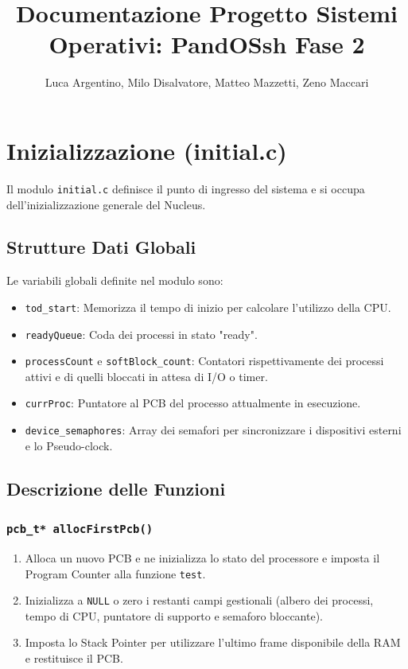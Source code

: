 \documentclass[a4paper,12pt]{article}
\title{Documentazione Progetto Sistemi Operativi: PandOSsh Fase 2}
\author{Luca Argentino, Milo Disalvatore, Matteo Mazzetti, Zeno Maccari}
\begin{document}
\maketitle

\section{Inizializzazione (initial.c)}
Il modulo \texttt{initial.c} definisce il punto di ingresso del sistema e si occupa dell'inizializzazione generale del Nucleus.

\vspace{0.5cm}
\subsection{Strutture Dati Globali}
Le variabili globali definite nel modulo sono:
\begin{itemize}
    \item \texttt{tod\_start}: Memorizza il tempo di inizio per calcolare l'utilizzo della CPU.
    \item \texttt{readyQueue}: Coda dei processi in stato "ready".
    \item \texttt{processCount} e \texttt{softBlock\_count}: Contatori rispettivamente dei processi attivi e di quelli bloccati in attesa di I/O o timer.
    \item \texttt{currProc}: Puntatore al PCB del processo attualmente in esecuzione.
    \item \texttt{device\_semaphores}: Array dei semafori per sincronizzare i dispositivi esterni e lo Pseudo-clock.
\end{itemize}

\vspace{0.5cm}
\subsection{Descrizione delle Funzioni}

\subsubsection{\texttt{pcb\_t* allocFirstPcb()}}
\begin{enumerate}
    \item Alloca un nuovo PCB e ne inizializza lo stato del processore e imposta il Program Counter alla funzione \texttt{test}.
    \item Inizializza a \texttt{NULL} o zero i restanti campi gestionali (albero dei processi, tempo di CPU, puntatore di supporto e semaforo bloccante).
    \item Imposta lo Stack Pointer per utilizzare l'ultimo frame disponibile della RAM e restituisce il PCB.
\end{enumerate}
\end{document}
